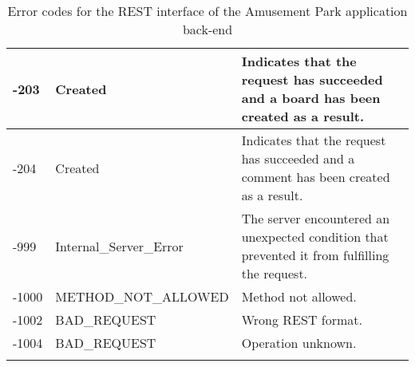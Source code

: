 \begin{longtable}{|p{}|p{} |p{}|}
-203  & Created                  & Indicates that the request has succeeded and a board has been created as a result. \\ \hline
-204  & Created                  & Indicates that the request has succeeded and a comment has been created as a result. \\ \hline
-999  & Internal\_Server\_Error  & The server encountered an unexpected condition that prevented it from fulfilling the request. \\ \hline
-1000 & METHOD\_NOT\_ALLOWED     & Method not allowed. \\ \hline
-1002 & BAD\_REQUEST             & Wrong REST format. \\ \hline
-1004 & BAD\_REQUEST             & Operation unknown. \\ \hline



\caption{Error codes for the REST interface of the Amusement Park application back-end}
\label{tab:termGlossary}
\end{longtable}